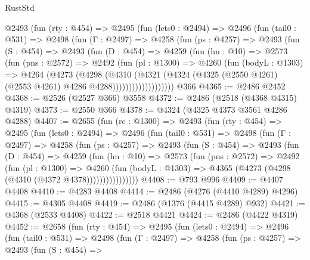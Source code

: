 \begin{lexlean}{RustStd}
\begin{coremodule}
      @2493
        (fun (rty : @454) =>
        @2495
          (fun (lets0 : @2494) =>
          @2496
            (fun (tail0 : @531) =>
            @2498
              (fun (Γ : @2497) =>
              @4258
                (fun (ps : @4257) =>
                @2493
                  (fun (S : @454) =>
                  @2493
                    (fun (D : @454) =>
                    @4259
                      (fun (hn : @10) =>
                      @2573
                        (fun (pns : @2572) =>
                        @2492
                          (fun (pl : @1300) =>
                          @4260
                            (fun (bodyL : @1303) =>
                            @4264
                              (@4273
                                (@4298
                                  (@4310
                                    (@4321
                                      (@4324
                                        (@4325
                                          (@2550 @4261)
                                          (@2553 @4261)
                                          @4286
                                          @4288)))))))))))))))))))
    @366
@4365 := @2486 @2452
@4368 := @2526 (@2527 @366) @3558
@4372 := @2486 (@2518 (@4368 @4315) @4319)
@4373 := @2550 @366
@4378 := @4324 (@4325 @4373 @3561 @4286 @4288)
@4407 := @2655
    (fun (rc : @1300) =>
    @2493
      (fun (rty : @454) =>
      @2495
        (fun (lets0 : @2494) =>
        @2496
          (fun (tail0 : @531) =>
          @2498
            (fun (Γ : @2497) =>
            @4258
              (fun (ps : @4257) =>
              @2493
                (fun (S : @454) =>
                @2493
                  (fun (D : @454) =>
                  @4259
                    (fun (hn : @10) =>
                    @2573
                      (fun (pns : @2572) =>
                      @2492
                        (fun (pl : @1300) =>
                        @4260
                          (fun (bodyL : @1303) =>
                          @4365 (@4273 (@4298 (@4310 (@4372 @4378))))))))))))))))
@4408 := @793 @996
@4409 := @4407 @4408
@4410 := @4283 @4408
@4414 := @2486 (@4276 (@4410 @4289) @4296)
@4415 := @4305 @4408
@4419 := @2486 (@1376 (@4415 @4289) @932)
@4421 := @4368 (@2533 @4408)
@4422 := @2518 @4421
@4424 := @2486 (@4422 @4319)
@4452 := @2658
    (fun (rty : @454) =>
    @2495
      (fun (lets0 : @2494) =>
      @2496
        (fun (tail0 : @531) =>
        @2498
          (fun (Γ : @2497) =>
          @4258
            (fun (ps : @4257) =>
            @2493
              (fun (S : @454) =>

\end{coremodule}
\end{lexlean}
